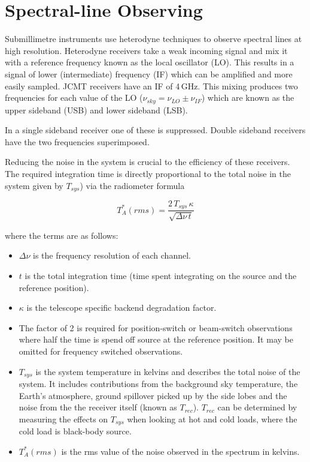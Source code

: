 \documentclass[11pt,oneside,chapters]{starlink}
\begin{document}
\section{Spectral-line Observing}

Submillimetre instruments use heterodyne techniques to observe
spectral lines at high resolution. Heterodyne receivers take a weak
incoming signal and mix it with a reference frequency known as the
local oscillator (LO). This results in a signal of lower
(intermediate) frequency (IF) which can be amplified and more easily
sampled. JCMT receivers have an IF of 4\,GHz. This mixing produces two
frequencies for each value of the LO ($\nu_{sky} =
\nu_{LO}\pm\nu_{IF}$) which are known as the upper sideband (USB) and
lower sideband (LSB).

In a single sideband receiver one of these is suppressed. Double
sideband receivers have the two frequencies superimposed.

Reducing the noise in the system is crucial to the efficiency of these
receivers. The required integration time is directly proportional to
the total noise in the system given by $T_{sys}$) via the radiometer
formula

\[T_A^*(rms) = \frac{2\,T_{sys}\,\kappa}{\sqrt{\Delta\nu\,t}}\]

where the terms are as follows:
\begin{itemize}
\item $\Delta\nu$ is the frequency resolution of each channel.

\item $t$ is the total integration time (time spent integrating on the
source and the reference position).

\item $\kappa$ is the telescope specific backend degradation factor.

\item The factor of 2 is required for position-switch or beam-switch
observations where half the time is spend off source at the reference
position. It may be omitted for frequency switched observations.

\item $T_{sys}$ is the system temperature in kelvins and describes the
total noise of the system. It includes contributions from the
background sky temperature, the Earth's atmosphere, ground spillover
picked up by the side lobes and the noise from the the receiver itself
(known as $T_{rec}$).  $T_{rec}$ can be determined by measuring the
effects on $T_{sys}$ when looking at hot and cold loads, where the
cold load is black-body source.

\item $T^*_{A}(rms)$ is the rms value of the noise observed in the
spectrum in kelvins. \end{itemize}
\end{document}
